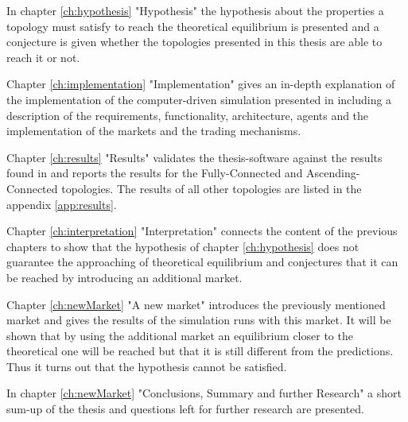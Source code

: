 \documentclass[Bachelorarbeit.tex]{subfiles}
\begin{document}
In chapter \ref{ch:hypothesis} "Hypothesis" the hypothesis about the properties a topology must satisfy to reach the theoretical equilibrium is presented and a conjecture is given whether the topologies presented in this thesis are able to reach it or not.

\bigskip

Chapter \ref{ch:implementation} "Implementation" gives an in-depth explanation of the implementation of the computer-driven simulation presented in \cite{Breuer2015} including a description of the requirements, functionality, architecture, agents and the implementation of the markets and the trading mechanisms.

\bigskip

Chapter \ref{ch:results} "Results" validates the thesis-software against the results found in \cite{Breuer2015} and reports the results for the Fully-Connected and Ascending-Connected topologies. The results of all other topologies are listed in the appendix \ref{app:results}.

\bigskip

Chapter \ref{ch:interpretation} "Interpretation" connects the content of the previous chapters to show that the hypothesis of chapter \ref{ch:hypothesis} does not guarantee the approaching of theoretical equilibrium and conjectures that it can be reached by introducing an additional market.

\bigskip

Chapter \ref{ch:newMarket} "A new market" introduces the previously mentioned market and gives the results of the simulation runs with this market. It will be shown that by using the additional market an equilibrium closer to the theoretical one will be reached but that it is still different from the predictions. Thus it turns out that the hypothesis cannot be satisfied.

\bigskip

In chapter \ref{ch:newMarket} "Conclusions, Summary and further Research" a short sum-up of the thesis and questions left for further research are presented.
\end{document}
